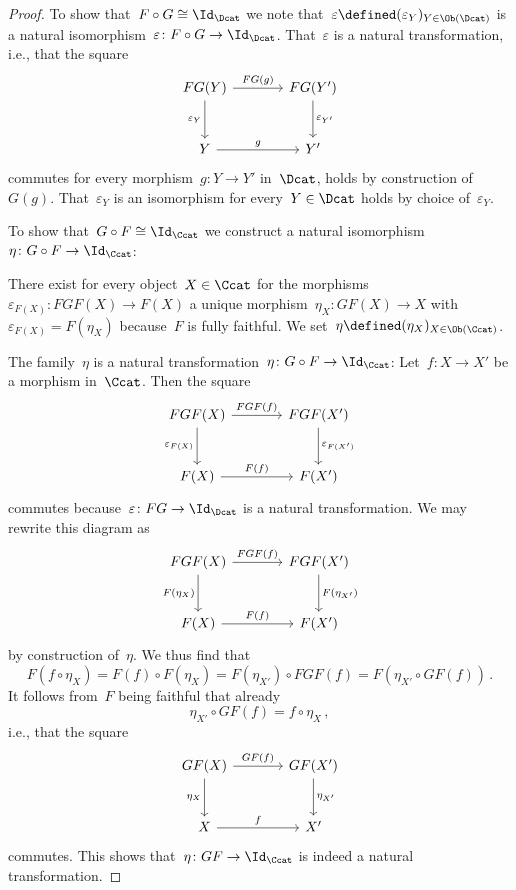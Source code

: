 \begin{proof}
  To show that~$F \circ G \cong \Id_\Dcat$ we note that~$\varepsilon \defined (\varepsilon_Y)_{Y \in \Ob(\Dcat)}$ is a natural isomorphism~$\varepsilon \colon F \circ G \to \Id_\Dcat$.
  That~$\varepsilon$ is a natural transformation, i.e., that the square
  \[
    \begin{tikzcd}[sep = large]
        FG(Y)
        \arrow{r}[above]{FG(g)}
        \arrow{d}[left]{\varepsilon_Y}
      & FG(Y')
        \arrow{d}[right]{\varepsilon_{Y'}}
      \\
        Y
        \arrow{r}[above]{g}
      & Y'
    \end{tikzcd}
  \]
  commutes for every morphism~$g \colon Y \to Y'$ in~$\Dcat$, holds by construction of~$G(g)$.
  That~$\varepsilon_Y$ is an isomorphism for every~$Y \in \Dcat$ holds by choice of~$\varepsilon_Y$.
  
  To show that~$G \circ F \cong \Id_\Ccat$ we construct a natural isomorphism~$\eta \colon G \circ F \to \Id_\Ccat$:
  
  There exist for every object~$X \in \Ccat$ for the morphisms~$\varepsilon_{F(X)} \colon FGF(X) \to F(X)$ a unique morphism~$\eta_X \colon GF(X) \to X$ with~$\varepsilon_{F(X)} = F(\eta_X)$ because~$F$ is fully faithful.
  We set~$\eta \defined (\eta_X)_{X \in \Ob(\Ccat)}$.
  
  The family~$\eta$ is a natural transformation~$\eta \colon G \circ F \to \Id_\Ccat$:
  Let~$f \colon X \to X'$ be a morphism in~$\Ccat$.
  Then the square
  \[
    \begin{tikzcd}[sep = large]
        FGF(X)
        \arrow{r}[above]{FGF(f)}
        \arrow{d}[left]{\varepsilon_{F(X)}}
      & FGF(X')
        \arrow{d}[right]{\varepsilon_{F(X')}}
      \\
        F(X)
        \arrow{r}[above]{F(f)}
      & F(X')
    \end{tikzcd}
  \]
  commutes because~$\varepsilon \colon FG \to \Id_\Dcat$ is a natural transformation.
  We may rewrite this diagram as
  \[
    \begin{tikzcd}[sep = large]
        FGF(X)
        \arrow{r}[above]{FGF(f)}
        \arrow{d}[left]{F(\eta_X)}
      & FGF(X')
        \arrow{d}[right]{F(\eta_{X'})}
      \\
        F(X)
        \arrow{r}[above]{F(f)}
      & F(X')
    \end{tikzcd}
  \]
  by construction of~$\eta$.
  We thus find that
  \[
      F(f \circ \eta_X)
    = F(f) \circ F(\eta_X)
    = F(\eta_{X'}) \circ FGF(f)
    = F(\eta_{X'} \circ GF(f)) \,.
  \]
  It follows from~$F$ being faithful that already
  \[
      \eta_{X'} \circ GF(f)
    = f \circ \eta_X \,,
  \]
  i.e., that the square
  \begin{equation}
    \label{naturality of eta}
    \begin{tikzcd}[sep = large]
        GF(X)
        \arrow{r}[above]{GF(f)}
        \arrow{d}[left]{\eta_X}
      & GF(X')
        \arrow{d}[right]{\eta_{X'}}
      \\
        X
        \arrow{r}[above]{f}
      & X'
    \end{tikzcd}
  \end{equation}
  commutes.
  This shows that~$\eta \colon GF \to \Id_\Ccat$ is indeed a natural transformation.
  

\end{proof}
